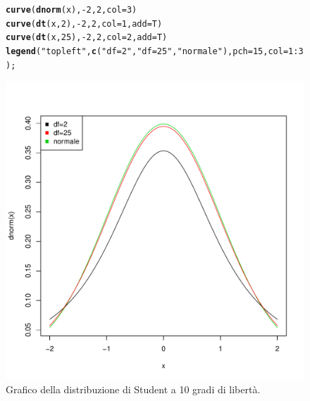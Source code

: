 \documentclass[onecolumn,12pt]{book}\usepackage[]{graphicx}\usepackage[]{color}
\makeatletter
\def\maxwidth{ %
  \ifdim\Gin@nat@width>\linewidth
    \linewidth
  \else
    \Gin@nat@width
  \fi
}
\newcommand{\hlnum}[1]{\textcolor[rgb]{0.686,0.059,0.569}{#1}}%
\newcommand{\hlstr}[1]{\textcolor[rgb]{0.192,0.494,0.8}{#1}}%
\newcommand{\hlopt}[1]{\textcolor[rgb]{0,0,0}{#1}}%
\newcommand{\hlstd}[1]{\textcolor[rgb]{0.345,0.345,0.345}{#1}}%
\newcommand{\hlkwc}[1]{\textcolor[rgb]{0.333,0.667,0.333}{#1}}%
\newcommand{\hlkwd}[1]{\textcolor[rgb]{0.737,0.353,0.396}{\textbf{#1}}}%
\newenvironment{kframe}{%
 \def\at@end@of@kframe{}%
 \ifinner\ifhmode%
  \def\at@end@of@kframe{\end{minipage}}%
  \begin{minipage}{\columnwidth}%
 \fi\fi%
 \def\FrameCommand##1{\hskip\@totalleftmargin \hskip-\fboxsep
 \colorbox{shadecolor}{##1}\hskip-\fboxsep
     \hskip-\linewidth \hskip-\@totalleftmargin \hskip\columnwidth}%
 \MakeFramed {\advance\hsize-\width
   \@totalleftmargin\z@ \linewidth\hsize
   \@setminipage}}%
 {\par\unskip\endMakeFramed%
 \at@end@of@kframe}
\newenvironment{knitrout}{}{} %
\makeatother
\begin{document}
\begin{figure}[H]
\begin{center}
\begin{knitrout}
\color{fgcolor}\begin{kframe}
\begin{alltt}
\hlkwd{curve}\hlstd{(}\hlkwd{dnorm}\hlstd{(x),}\hlopt{-}\hlnum{2}\hlstd{,}\hlnum{2}\hlstd{,}\hlkwc{col}\hlstd{=}\hlnum{3}\hlstd{)}
\hlkwd{curve}\hlstd{(}\hlkwd{dt}\hlstd{(x,}\hlnum{2}\hlstd{),}\hlopt{-}\hlnum{2}\hlstd{,}\hlnum{2}\hlstd{,}\hlkwc{col}\hlstd{=}\hlnum{1}\hlstd{,}\hlkwc{add}\hlstd{=T)}
\hlkwd{curve}\hlstd{(}\hlkwd{dt}\hlstd{(x,}\hlnum{25}\hlstd{),}\hlopt{-}\hlnum{2}\hlstd{,}\hlnum{2}\hlstd{,}\hlkwc{col}\hlstd{=}\hlnum{2}\hlstd{,}\hlkwc{add}\hlstd{=T)}
\hlkwd{legend}\hlstd{(}\hlstr{"topleft"}\hlstd{,} \hlkwd{c}\hlstd{(}\hlstr{"df=2"}\hlstd{,}\hlstr{"df=25"}\hlstd{,}\hlstr{"normale"}\hlstd{),}\hlkwc{pch}\hlstd{=}\hlnum{15}\hlstd{,}\hlkwc{col}\hlstd{=}\hlnum{1}\hlopt{:}\hlnum{3}\hlstd{);}
\end{alltt}
\end{kframe}
\includegraphics[width=\maxwidth]{figure/unnamed-chunk-151-1} 

\end{knitrout}
\caption{Grafico della distribuzione di Student a 10 gradi di libert\`a. }
\label{fig:graficostudent}
\end{center}
\end{figure}
\end{document}
